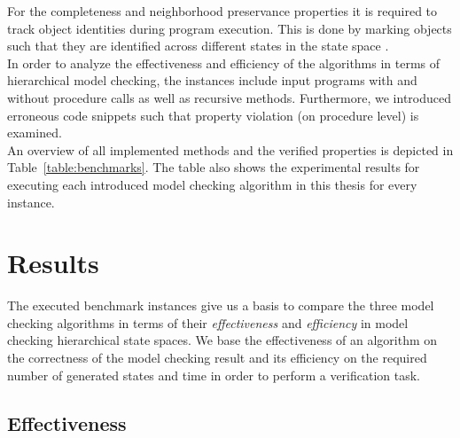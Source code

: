 \documentclass[a4paper, 12pt, twoside]{report}
\begin{document}
	For the completeness and neighborhood preservance properties it is required to track object identities during program execution. This is done by marking objects such that they are identified across different states in the state space \cite{arndt2018let, heinen2015verifyingPhd}.\\
	
	In order to analyze the effectiveness and efficiency of the algorithms in terms of hierarchical model checking, the instances include input programs with and without procedure calls as well as recursive methods. Furthermore, we introduced erroneous code snippets such that property violation (on procedure level) is examined.\\
	
	An overview of all implemented methods and the verified properties is depicted in Table~\ref{table:benchmarks}. The table also shows the experimental results for executing each introduced model checking algorithm in this thesis for every instance. \\
	
	\section{Results}
	
	The executed benchmark instances give us a basis to compare the three model checking algorithms in terms of their \textit{effectiveness} and \textit{efficiency} in model checking hierarchical state spaces. We base the effectiveness of an algorithm on the correctness of the model checking result and its efficiency on the required number of generated states and time in order to perform a verification task.
	
	\subsection{Effectiveness}
	
\end{document}
